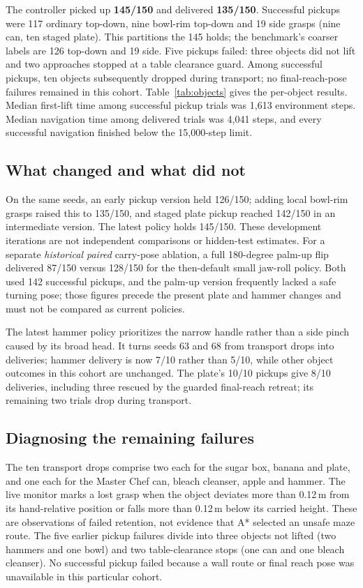 \documentclass[10pt,a4paper]{article}
\begin{document}
The controller picked up \textbf{145/150} and delivered \textbf{135/150}.
Successful pickups were 117 ordinary top-down, nine bowl-rim top-down and
19 side grasps (nine can, ten staged plate). This partitions the 145 holds;
the benchmark's coarser labels are 126 top-down and 19 side. Five pickups
failed: three objects did not lift and two approaches stopped at a table
clearance guard. Among successful pickups, ten objects subsequently dropped
during transport; no final-reach-pose failures remained in this cohort.
Table~\ref{tab:objects} gives the per-object results. Median first-lift time
among successful pickup trials was 1,613 environment steps. Median navigation
time among delivered trials was 4,041 steps, and every successful navigation
finished below the 15,000-step limit.

\subsection{What changed and what did not}
On the same seeds, an early pickup version held 126/150; adding local bowl-rim
grasps raised this to 135/150, and staged plate pickup reached 142/150 in an
intermediate version. The latest policy holds 145/150. These development
iterations are not independent comparisons or hidden-test estimates. For a
separate \emph{historical paired} carry-pose ablation, a full 180-degree
palm-up flip delivered 87/150 versus 128/150 for the then-default small
jaw-roll policy. Both used 142 successful pickups, and the palm-up version
frequently lacked a safe turning pose; those figures precede the present
plate and hammer changes and must not be compared as current policies.

The latest hammer policy prioritizes the narrow handle rather than a side
pinch caused by its broad head. It turns seeds 63 and 68 from transport drops
into deliveries; hammer delivery is now 7/10 rather than 5/10, while other
object outcomes in this cohort are unchanged. The plate's 10/10 pickups give
8/10 deliveries, including three rescued by the guarded final-reach retreat;
its remaining two trials drop during transport.

\subsection{Diagnosing the remaining failures}
The ten transport drops comprise two each for the sugar box, banana and
plate, and one each for the Master Chef can, bleach cleanser, apple and
hammer. The live monitor marks a lost grasp when the object deviates more
than 0.12\,m from its hand-relative position or falls more than 0.12\,m below
its carried height. These are observations of failed retention, not evidence
that A* selected an unsafe maze route. The five earlier pickup failures
divide into three objects not lifted (two hammers and one bowl) and two
table-clearance stops (one can and one bleach cleanser). No successful
pickup failed because a wall route or final reach pose was unavailable in
this particular cohort.
\end{document}
